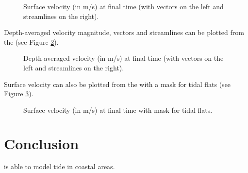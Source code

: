 \begin{figure}[H]
\begin{minipage}[t]{0.5\textwidth}
 \centering
\end{minipage}%
\begin{minipage}[t]{0.5\textwidth}
 \centering
\end{minipage}
  \caption{Surface velocity (in m/s) at final time (with vectors on the left and streamlines on the right).}
  \label{fig:tide:U}
\end{figure}

Depth-averaged velocity magnitude, vectors and streamlines can be plotted
from the  (see Figure \ref{fig:tide:average:U}).

\begin{figure}[H]
\begin{minipage}[t]{0.5\textwidth}
 \centering
\end{minipage}%
\begin{minipage}[t]{0.5\textwidth}
 \centering
\end{minipage}
  \caption{Depth-averaged velocity (in m/s) at final time (with vectors on the left and streamlines on the right).}
  \label{fig:tide:average:U}
\end{figure}

Surface velocity can also be plotted from the  with a
mask for tidal flats (see Figure \ref{fig:tide:surf:U}).

\begin{figure}[H]
 \centering
  \caption{Surface velocity (in m/s) at final time with mask for tidal flats.}\label{fig:tide:surf:U}
\end{figure}

\section{Conclusion}

 is able to model tide in coastal areas.
